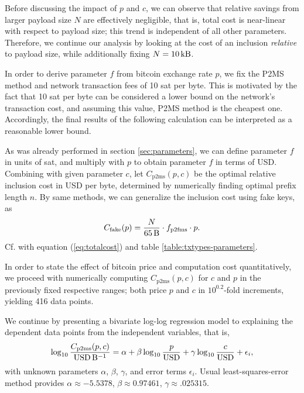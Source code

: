 \documentclass[a4paper,11pt,titlepage]{scrbook}
\begin{document}
Before discussing the impact of $p$ and $c$, we can observe that relative savings from larger payload size $N$ are effectively negligible, that is, total cost is near-linear with respect to payload size;
this trend is independent of all other parameters.
Therefore, we continue our analysis by looking at the cost of an inclusion \emph{relative} to payload size, while additionally fixing $N=\SI{10}{\kilo\byte}$.

In order to derive parameter $f$ from bitcoin exchange rate $p$, we fix the P2MS method and network transaction fees of 10 sat per byte.
%
%
This is motivated by the fact that 10 sat per byte can be considered a lower bound on the network's transaction cost, and assuming this value, P2MS method is the cheapest one.
Accordingly, the final results of the following calculation can be interpreted as a reasonable lower bound.

As was already performed in section \ref{sec:parameters}, we can define parameter $f$ in units of sat, and multiply with $p$ to obtain parameter $f$ in terms of USD.
Combining with given parameter $c$, let $C_\text{p2ms}(p,c)$ be the optimal relative inclusion cost in USD per byte, determined by numerically finding optimal prefix length $n$.
By same methods, we can generalize the inclusion cost using fake keys, as
\[ C_\text{fake}(p) = \frac{N}{\SI{65}{\byte}} \cdot f_\text{p2fms} \cdot p. \]
Cf. with equation (\ref{eq:totalcost}) and table \ref{table:txtypes-parameters}.

In order to state the effect of bitcoin price and computation cost quantitatively, we proceed with numerically computing $C_\text{p2ms}(p,c)$ for $c$ and $p$ in the previously fixed respective ranges; both price $p$ and $c$ in $10^{0.2}$-fold increments, yielding 416 data points.

We continue by presenting a bivariate log-log regression model to explaining the dependent data points from the independent variables, that is,
\begin{equation} \log_{10} \frac{C_\text{p2ms}(p, c)}{\text{USD}\,\si{\per\byte}} = \alpha + \beta \log_{10} \frac{p}{\text{USD}} + \gamma \log_{10} \frac{c}{\text{USD}} + \epsilon_i, \label{eq:regressionmodel}\end{equation}
with unknown parameters $\alpha$, $\beta$, $\gamma$, and error terms $\epsilon_i$.
Usual least-squares-error method provides $\alpha \approx \num{-5.5378}$, $\beta \approx\num{0.97461}$, $\gamma \approx\num{.025315}$.
\end{document}
